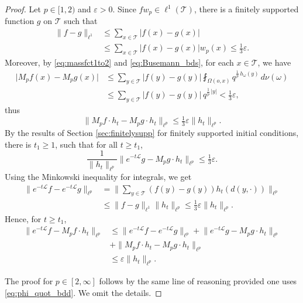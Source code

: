 \documentclass[11pt,a4paper,reqno]{amsart}
\renewcommand\mathcal{\mathscr}
\theoremstyle{plain}
\theoremstyle{remark}
\theoremstyle{definition}
\theoremstyle{remark}
\numberwithin{equation}{section}
\begin{document}
	\begin{proof}
		Let $p \in [1, 2)$ and $\varepsilon > 0$. Since $f w_p \in \ell^1(\mathcal{T})$, there is  a finitely supported function $g$ on
		$\mathcal{T}$ such that
		\begin{align*}
			\|f - g\|_{\ell^1} 
			&\leq \sum_{x \in \mathcal{T}} |f(x) - g(x)| \\
			&\leq \sum_{x \in \mathcal{T}} |f(x) - g(x)| w_p(x) 
			\leq \tfrac{1}{3} \varepsilon. 
		\end{align*}
		Moreover, by \eqref{eq:massfct1to2} and \eqref{eq:Busemann_bds}, for each $x \in \mathcal{T}$,  we have
		\begin{align*}
			\big| M_pf(x) - M_pg(x)\big| 
			&\leq
			\sum_{y \in \mathcal{T}} |f(y) - g(y)| 
			\fint_{\Omega(o, x)} q^{\frac{1}{p}\, {h_{\omega}(y)}}\, d\nu(\omega) \\
			&\leq  \sum_{y\in \mathcal{T}} |f(y)-g(y)|\, q^{\frac{1}{p}\,|y| }
			< \tfrac{1}{3}\varepsilon,
		\end{align*}
		thus
		\[
		\big\|M_pf \cdot h_t - M_pg \cdot h_t \big\|_{\ell^p}
		\leq
		\tfrac{1}{3}\varepsilon \|h_t\|_{\ell^p}.
		\]
		By the results of Section \ref{sec:finitelysupp} for finitely supported initial conditions, there is $t_1 \geqslant 1$,
		such that for all $t \geqslant t_1$,
		\[
		\frac{1}{\|h_t\|_{\ell^p}}
		\big\|e^{-t\mathcal{L}}g-M_pg \cdot h_t\big\|_{\ell^p}
		\leq \tfrac{1}{3} \varepsilon.
		\]
		Using the Minkowski inequality for integrals, we get
		\begin{align*}
			\big\|e^{-t\mathcal{L}}f - e^{-t\mathcal{L}}g \big\|_{\ell^p}
			&=
			\bigg\|\sum_{y \in \mathcal{T}} (f(y)-g(y)) h_t(d(y,\cdot)) \bigg\|_{\ell^p} \\
			&\leq
			\|f -g\|_{\ell^1} \|h_t\|_{\ell^p} 
			\leq \tfrac{1}{3} \varepsilon  \|h_t\|_{\ell^p}.
		\end{align*}
		Hence, for $t \geqslant t_1$,
		\begin{align*}
			\big\|e^{-t\mathcal{L}}f-M_pf \cdot h_t\|_{\ell^p}
			&\leq
			\big\|e^{-t\mathcal{L}}f - e^{-t\mathcal{L}}g \big\|_{\ell^p}
			+
			\big\|e^{-t\mathcal{L}}g-M_pg \cdot h_t \big\|_{\ell^p}
			\\
			&+\big\|M_pf \cdot h_t - M_pg \cdot h_t \big\|_{\ell^p}
			\\
			&\leq \varepsilon \|h_t\|_{\ell^p}.
		\end{align*}
	
		The proof for $p \in [2, \infty]$ follows by the same line of reasoning provided one uses \eqref{eq:phi_quot_bdd}. We omit the details.
	\end{proof}
\end{document}
